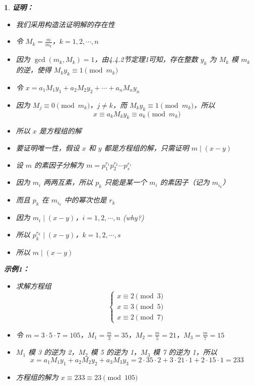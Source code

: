 \documentclass[UTF8]{report}
\theoremstyle{MyLineTheoremStyle} %
\theoremstyle{MyBlockTheoremStyle} %
\theoremstyle{MySubsubsectionStyle} %
\newtheorem{definition}{}
\begin{document}
\begin{definition}
    \textbf{证明：}
    \begin{itemize}
        \item 我们采用构造法证明解的存在性
        \item 令 $M_k = \frac{m}{m_k}$，$k = 1, 2, \cdots, n$
        \item 因为 $\gcd(m_k, M_k) = 1$，由4.4.2节定理1可知，存在整数 $y_k$ 为 $M_k$ 模 $m_k$ 的逆，使得 $M_ky_k \equiv 1 \pmod{m_k}$
        \item 令 $x = a_1M_1y_1 + a_2M_2y_2 + \cdots + a_nM_ny_n$
        \item 因为 $M_j \equiv 0 \pmod{m_k}$，$j \neq k$，而 $M_ky_k \equiv 1 \pmod{m_k}$，所以
        \[
        x \equiv a_kM_ky_k \equiv a_k \pmod{m_k}
        \]
        \item 所以 $x$ 是方程组的解
        \item 要证明唯一性，假设 $x$ 和 $y$ 都是方程组的解，只需证明 $m \mid (x - y)$
        \item 设 $m$ 的素因子分解为 $m = p_1^{r_1}p_2^{r_2} \cdots p_s^{r_s}$
        \item 因为 $m_i$ 两两互素，所以 $p_k$ 只能是某一个 $m_i$ 的素因子（记为 $m_{i_k}$）
        \item 而且 $p_k$ 在 $m_{i_k}$ 中的幂次也是 $r_k$
        \item 因为 $m_i \mid (x - y)$，$i = 1, 2, \cdots, n$ (why?)
        \item 所以 $p_k^{r_k} \mid (x - y)$，$k = 1, 2, \cdots, s$
        \item 所以 $m \mid (x - y)$
    \end{itemize}

    \textbf{示例1：}
    \begin{itemize}
        \item 求解方程组
        \[
        \begin{cases}
            x \equiv 2 \pmod{3} \\
            x \equiv 3 \pmod{5} \\
            x \equiv 2 \pmod{7}
        \end{cases}
        \]
        \item 令 $m = 3 \cdot 5 \cdot 7 = 105$，$M_1 = \frac{m}{3} = 35$，$M_2 = \frac{m}{5} = 21$，$M_3 = \frac{m}{7} = 15$
        \item $M_1$ 模 3 的逆为 2，$M_2$ 模 5 的逆为 1，$M_3$ 模 7 的逆为 1，所以
        \[
        x = a_1M_1y_1 + a_2M_2y_2 + a_3M_3y_3 = 2 \cdot 35 \cdot 2 + 3 \cdot 21 \cdot 1 + 2 \cdot 15 \cdot 1 = 233
        \]
        \item 方程组的解为 $x \equiv 233 \equiv 23 \pmod{105}$
    \end{itemize}


\end{definition}
\end{document}
